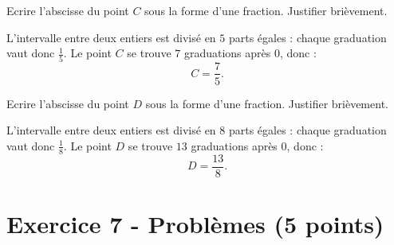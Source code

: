\documentclass[answers]{exam}
\begin{document}
\begin{questions}
  \question[0.75] Ecrire l'abscisse du point $C$ sous la forme d'une fraction. Justifier brièvement.


  \begin{solution}
    L'intervalle entre deux entiers est divisé en $5$ parts égales : chaque graduation vaut donc $\frac{1}{5}$. Le point $C$ se trouve $7$ graduations après $0$, donc :
    \[
      C = \dfrac{7}{5}.
    \]
  \end{solution}

  \question[0.75] Ecrire l'abscisse du point $D$ sous la forme d'une fraction. Justifier brièvement.


  \begin{solution}
    L'intervalle entre deux entiers est divisé en $8$ parts égales : chaque graduation vaut donc $\frac{1}{8}$. Le point $D$ se trouve $13$ graduations après $0$, donc :
    \[
      D = \dfrac{13}{8}.
    \]
  \end{solution}

\end{questions}


\section*{Exercice 7 - Problèmes (5 points)}
\end{document}

